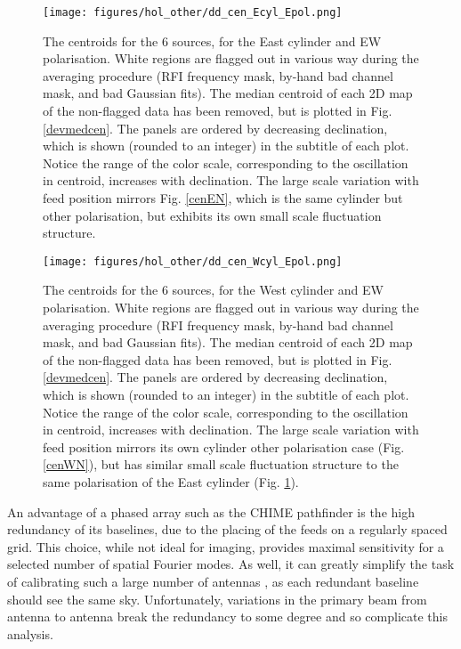 \begin{figure}[h!]
\begin{center}
\texttt{[image: figures/hol\_other/dd\_cen\_Ecyl\_Epol.png]}
\caption{The centroids for the 6 sources, for the East cylinder and EW polarisation. White regions are flagged out in various way during the averaging procedure (RFI frequency mask, by-hand bad channel mask, and bad Gaussian fits). The median centroid of each 2D map of the non-flagged data has been removed, but is plotted in Fig. \ref{devmedcen}. The panels are ordered by decreasing declination, which is shown (rounded to an integer) in the subtitle of each plot. Notice the range of the color scale, corresponding to the oscillation in centroid, increases with declination. \newline The large scale variation with feed position mirrors Fig. \ref{cenEN}, which is the same cylinder but other polarisation, but exhibits its own small scale fluctuation structure.}
\label{cenEE}
\end{center}
\end{figure}

\begin{figure}[h!]
\begin{center}
\texttt{[image: figures/hol\_other/dd\_cen\_Wcyl\_Epol.png]}
\caption{The centroids for the 6 sources, for the West cylinder and EW polarisation. White regions are flagged out in various way during the averaging procedure (RFI frequency mask, by-hand bad channel mask, and bad Gaussian fits). The median centroid of each 2D map of the non-flagged data has been removed, but is plotted in Fig. \ref{devmedcen}. The panels are ordered by decreasing declination, which is shown (rounded to an integer) in the subtitle of each plot. Notice the range of the color scale, corresponding to the oscillation in centroid, increases with declination. 
\newline The large scale variation with feed position mirrors its own cylinder other polarisation case (Fig. \ref{cenWN}), but has similar small scale fluctuation structure to the same polarisation of the East cylinder (Fig. \ref{cenEE}).}
\label{cenWE}
\end{center}
\end{figure}

An advantage of a phased array such as the CHIME pathfinder is the high redundancy of its baselines, due to the placing of the feeds on a regularly spaced grid. This choice, while not ideal for imaging, provides maximal sensitivity for a selected number of spatial Fourier modes. As well, it can greatly simplify the task of calibrating such a large number of antennas \citep{redundantbaselines}, as each redundant baseline should see the same sky. Unfortunately, variations in the primary beam from antenna to antenna break the redundancy to some degree and so complicate this analysis.

